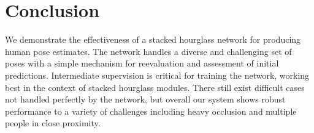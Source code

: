 \documentclass[runningheads]{llncs}
\begin{document}

\section{Conclusion}

We demonstrate the effectiveness of a stacked hourglass network for
producing human pose estimates. The network handles a diverse and
challenging set of poses with a simple mechanism for reevaluation and
assessment of initial predictions. Intermediate supervision is
critical for training the network, working best in the context of
stacked hourglass modules. There still exist difficult cases not
handled perfectly by the network, but overall our system shows robust
performance to a variety of challenges including heavy occlusion and
multiple people in close proximity.



\end{document}
